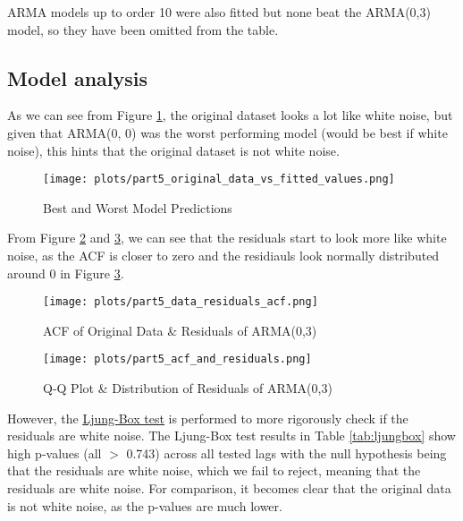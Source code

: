 \documentclass{article}
\begin{document}
ARMA models up to order 10 were also fitted but none beat the ARMA(0,3) model, so they have been omitted from the table.

\subsection{Model analysis}

As we can see from Figure \ref{fig:part5_original_data_vs_fitted_values}, the original dataset looks a lot like white noise, but given that ARMA(0, 0) was the worst performing model (would be best if white noise), this hints that the original dataset is not white noise.

\begin{figure}[H]
    \centering
    \texttt{[image: plots/part5\_original\_data\_vs\_fitted\_values.png]}
    \caption{Best and Worst Model Predictions}
    \label{fig:part5_original_data_vs_fitted_values}
\end{figure}

From Figure \ref{fig:part5_data_residuals_acf} and \ref{fig:part5_acf_and_residuals}, we can see that the residuals start to look more like white noise, as the ACF is closer to zero and the residiauls look normally distributed around 0 in Figure \ref{fig:part5_acf_and_residuals}.

\begin{figure}[H]
    \centering
    \texttt{[image: plots/part5\_data\_residuals\_acf.png]}
    \caption{ACF of Original Data \& Residuals of ARMA(0,3)}
    \label{fig:part5_data_residuals_acf}
\end{figure}

\begin{figure}[H]
    \centering
    \texttt{[image: plots/part5\_acf\_and\_residuals.png]}
    \caption{Q-Q Plot \& Distribution of Residuals of ARMA(0,3)}
    \label{fig:part5_acf_and_residuals}
\end{figure}

However, the \href{https://en.wikipedia.org/wiki/Ljung%E2%80%93Box_test}{\underline{Ljung-Box test}} is performed to more rigorously check if the residuals are white noise. The Ljung-Box test results in Table \ref{tab:ljungbox} show high p-values (all $>$ 0.743) across all tested lags with the null hypothesis being that the residuals are white noise, which we fail to reject, meaning that the residuals are white noise. For comparison, it becomes clear that the original data is not white noise, as the p-values are much lower.
\end{document}
